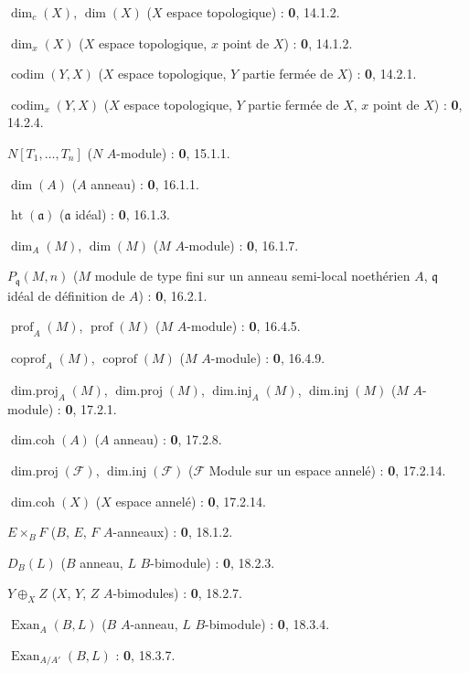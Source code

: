 $\dim_c(X)$, $\dim(X)$ ($X$ espace topologique) : \textbf{0}, 14.1.2.\par
$\dim_x(X)$ ($X$ espace topologique, $x$ point de $X$) : \textbf{0}, 14.1.2.\par
$\operatorname{codim}(Y,X)$ ($X$ espace topologique, $Y$ partie fermée de $X$) : \textbf{0}, 14.2.1.\par
$\operatorname{codim}_x(Y,X)$ ($X$ espace topologique, $Y$ partie fermée de $X$, $x$ point de $X$) : \textbf{0}, 14.2.4.\par
$N[T_1,\ldots,T_n]$ ($N$ $A$-module) : \textbf{0}, 15.1.1.\par
$\dim(A)$ ($A$ anneau) : \textbf{0}, 16.1.1.\par
$\operatorname{ht}(\mathfrak a)$ ($\mathfrak a$ idéal) : \textbf{0}, 16.1.3.\par
$\dim_A(M)$, $\dim(M)$ ($M$ $A$-module) : \textbf{0}, 16.1.7.\par
$P_{\mathfrak q}(M,n)$ ($M$ module de type fini sur un anneau semi-local noethérien $A$, $\mathfrak q$ idéal de définition de $A$) : \textbf{0}, 16.2.1.\par
$\operatorname{prof}_A(M)$, $\operatorname{prof}(M)$ ($M$ $A$-module) : \textbf{0}, 16.4.5.\par
$\operatorname{coprof}_A(M)$, $\operatorname{coprof}(M)$ ($M$ $A$-module) : \textbf{0}, 16.4.9.\par
$\operatorname{dim.proj}_A(M)$, $\operatorname{dim.proj}(M)$,
$\operatorname{dim.inj}_A(M)$, $\operatorname{dim.inj}(M)$ ($M$ $A$-module) : \textbf{0}, 17.2.1.\par
$\operatorname{dim.coh}(A)$ ($A$ anneau) : \textbf{0}, 17.2.8.\par
$\operatorname{dim.proj}(\mathscr F)$, $\operatorname{dim.inj}(\mathscr F)$
($\mathscr F$ Module sur un espace annelé) : \textbf{0}, 17.2.14.\par
$\operatorname{dim.coh}(X)$ ($X$ espace annelé) : \textbf{0}, 17.2.14.\par
$E\times_B F$ ($B$, $E$, $F$ $A$-anneaux) : \textbf{0}, 18.1.2.\par
$D_B(L)$ ($B$ anneau, $L$ $B$-bimodule) : \textbf{0}, 18.2.3.\par
$Y\oplus_X Z$ ($X$, $Y$, $Z$ $A$-bimodules) : \textbf{0}, 18.2.7.\par
$\operatorname{Exan}_A(B,L)$ ($B$ $A$-anneau, $L$ $B$-bimodule) : \textbf{0}, 18.3.4.\par
$\operatorname{Exan}_{A/A'}(B,L)$ : \textbf{0}, 18.3.7.\par
